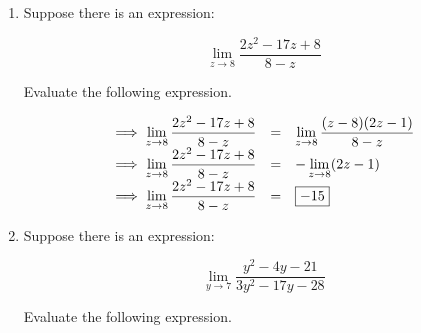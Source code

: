 \documentclass[10pt,paper=letter]{scrartcl}
\begin{document}
\begin{enumerate}[resume, label=\arabic*.,font=\bfseries]
\begin{enumerate}
\begin{equation*}
\begin{array}{lll}
                    \implies \displaystyle \mathop {\lim }\limits_{x \rightarrow 2} \dfrac{\sqrt{x+6}+\sqrt{10}}{x-4} + 8 & =  &   \displaystyle \mathop {\lim }\limits_{x \rightarrow 2} \dfrac{\sqrt{8}+\sqrt{10}}{-2} + 8\\
                    
                     \implies \displaystyle \mathop {\lim }\limits_{x \rightarrow 2} \dfrac{\sqrt{x+6}+\sqrt{10}}{x-4} + 8 & =  & \fbox{8 - \dfrac{\sqrt{8}+\sqrt{10}}{2}} \\
           
            \end{array} 
        \end{equation*}
    \end{enumerate}
    
    \item Suppose there is an expression:
    
    $$\displaystyle \mathop {\lim }\limits_{z \to 8} \frac{{2{z^2} - 17z + 8}}{{8 - z}}$$
    
    Evaluate the following expression.
    

    \sol
    
    \begin{equation*}
        \begin{array}{lll}
          \implies \displaystyle \mathop {\lim }\limits_{z \to 8} \frac{{2{z^2} - 17z + 8}}{{8 - z}}  & = & \displaystyle \mathop {\lim }\limits_{z \to 8} \frac{(z-8)(2z - 1)}{{8 - z}}\\
             
                  \implies \displaystyle \mathop {\lim }\limits_{z \to 8} \frac{{2{z^2} - 17z + 8}}{{8 - z}}  & = & -\displaystyle \mathop {\lim }\limits_{z \to 8} (2z - 1)\\
                  
                   \implies \displaystyle \mathop {\lim }\limits_{z \to 8} \frac{{2{z^2} - 17z + 8}}{{8 - z}}  & = & \fbox{$-15$}\\
        \end{array}
    \end{equation*}
    
    
        \item Suppose there is an expression:
    
    $$\displaystyle \mathop {\lim }\limits_{y \to 7} \frac{{{y^2} - 4y - 21}}{{3{y^2} - 17y - 28}}$$
    
     Evaluate the following expression.
     

\end{enumerate}
\end{document}
